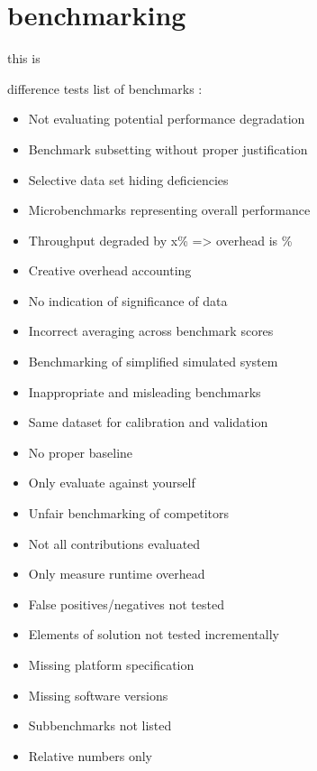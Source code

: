 




\section{benchmarking}

this is \cite{arcuri_practical_2011}

difference tests  \cite{sonnenwald2003evaluating}
\cite{lilja2005measuring}
\cite{bukh1992art}
list of benchmarks \cite{van_der_kouwe_benchmarking_2018}:
\begin{itemize}
    \item  Not evaluating potential performance degradation
    \item  Benchmark subsetting without proper justification
    \item  Selective data set hiding deficiencies
    \item  Microbenchmarks representing overall performance
    \item  Throughput degraded by x\% => overhead is \%
    \item  Creative overhead accounting
    \item  No indication of significance of data
    \item  Incorrect averaging across benchmark scores
    \item  Benchmarking of simplified simulated system
    \item  Inappropriate and misleading benchmarks
    \item  Same dataset for calibration and validation
    \item  No proper baseline
    \item  Only evaluate against yourself
    \item  Unfair benchmarking of competitors
    \item  Not all contributions evaluated
    \item  Only measure runtime overhead
    \item  False positives/negatives not tested
    \item  Elements of solution not tested incrementally
    \item  Missing platform specification
    \item  Missing software versions
    \item  Subbenchmarks not listed
    \item  Relative numbers only
\end{itemize}
\cite{mytkowicz2009producing}

